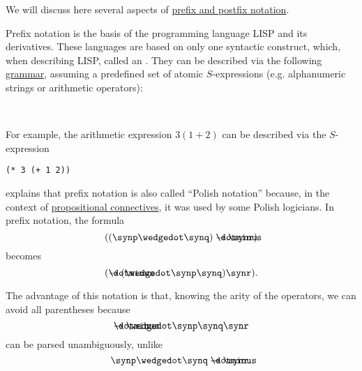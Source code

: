 \begin{remark}\label{rem:def:function_application_syntax}
  We will discuss here several aspects of \hyperref[def:function_application_syntax]{prefix and postfix notation}.

  \begin{thmenum}
     Prefix notation is the basis of the programming language LISP and its derivatives. These languages are based on only one syntactic construct, which, when describing LISP,  called an . They can be described via the following \hyperref[def:formal_grammar]{grammar}, assuming a predefined set of atomic \( S \)-expressions (e.g. alphanumeric strings or arithmetic operators):
    \begin{bnf*}
       { \bnfor {} \bnfsp \bnftsq{\textvisiblespace} \bnfsp {}} \\
            { \bnfor \bnftsq{(} \bnfsp {} \bnfsp \bnftsq{)}}
    \end{bnf*}

    For example, the arithmetic expression \( 3(1 + 2) \) can be described via the \( S \)-expression
    \begin{center}
      \begin{BVerbatim}[gobble=8]
        (* 3 (+ 1 2))
      \end{BVerbatim}
    \end{center}

      explains that prefix notation is also called \enquote{Polish notation} because, in the context of \hyperref[def:propositional_alphabet/connectives]{propositional connectives}, it was used by some Polish logicians. In prefix notation, the formula
    \begin{equation*}
      ((\synp \synwedge \synq) \synimplies \synr)
    \end{equation*}
    becomes
    \begin{equation*}
      (\synimplies (\synwedge \synp \synq) \synr).
    \end{equation*}

    The advantage of this notation is that, knowing the arity of the operators, we can avoid all parentheses because
    \begin{equation*}
      \synimplies \synwedge \synp \synq \synr
    \end{equation*}
    can be parsed unambiguously, unlike
    \begin{equation*}
      \synp \synwedge \synq \synimplies \synr.
    \end{equation*}


\end{thmenum}
\end{remark}
